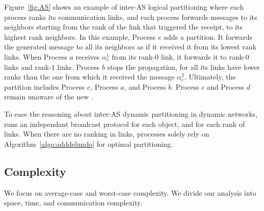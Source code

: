 Figure~\ref{fig:AS} shows an example of inter-AS logical partitioning
where each process ranks its communication links, and each process
forwards messages to its neighbors starting from the rank of the link
that triggered the receipt, to its highest rank neighbors. In this
example, Process $e$ adds a partition. It forwards the generated
message to all its neighbors as if it received it from its lowest rank
links. When Process $a$ receives $\alpha_e^1$ from its rank-$0$ link,
it forwards it to rank-$0$ links and rank-$1$ links.  Process $b$
stops the propagation, for all its links have lower ranks than the one
from which it received the message $\alpha_e^2$. Ultimately, the
partition includes Process $e$, Process $a$, and Process $b$. Process
$c$ and Process $d$ remain unaware of the new .

To ease the reasoning about inter-AS dynamic partitioning in dynamic
networks, \NAME runs an independant broadcast protocol for each
object, and for each rank of links.  
     When there
are no ranking in links, processes solely rely on
Algorithm~\ref{algo:adddelundo} for optimal partitioning.



\subsection{Complexity}
\label{subsec:complexity}


We focus on average-case and worst-case complexity. We divide our
analysis into space, time, and communication complexity.

